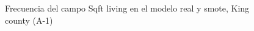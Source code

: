 \begin{figure}[H]
    \centering
    
    \caption{Frecuencia del campo Sqft living en el modelo real y smote, King county (A-1)}
    \label{frecuency-smote-sqft living}
\end{figure}